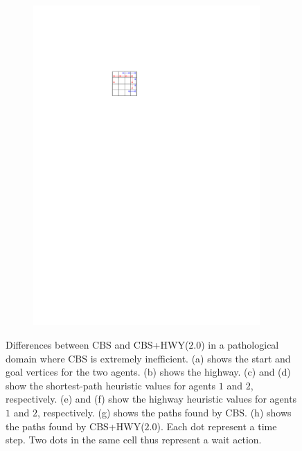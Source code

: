 \documentclass[letterpaper]{article}
\theoremstyle{definition}
\begin{document}
\begin{figure}[t]
\begin{subfigure}[b]{0.12\textwidth}
	\includegraphics[width=0.95\textwidth]{Figs/example1_EG_paths.pdf}
    \caption{}
  \end{subfigure}
  \caption{Differences between CBS and CBS+HWY($2.0$) in a pathological domain
    where CBS is extremely inefficient. (a) shows the start and goal vertices
    for the two agents. (b) shows the highway. (c) and (d) show the
    shortest-path heuristic values for agents $1$ and $2$, respectively. (e)
    and (f) show the highway heuristic values for agents $1$ and $2$,
    respectively. (g) shows the paths found by CBS. (h) shows the paths found
    by CBS+HWY($2.0$). Each dot represent a time step. Two dots in the same
    cell thus represent a wait action.}
    \label{example1_fig}
\end{figure}
\end{document}
